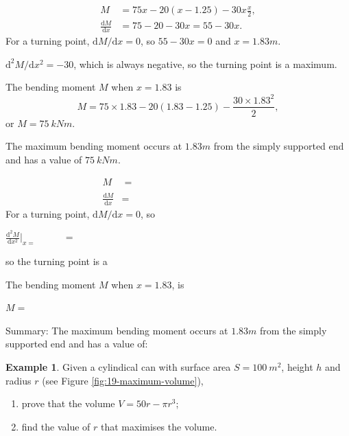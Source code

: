 \documentclass[
  english,
  11pt,
  oneside]{book}
\providecommand{\tightlist}{%
  \setlength{\itemsep}{0pt}\setlength{\parskip}{0pt}}
\newcommand{\slide}{}
\theoremstyle{definition}
\theoremstyle{definition}
\newtheorem{example}{Example}[chapter]
\theoremstyle{definition}
\theoremstyle{definition}
\theoremstyle{remark}
\begin{document}
\begin{notslides}

\begin{align*}
M &= 75x - 20(x-1.25) - 30x\frac{x}{2},\\
\frac{\mathrm{d}M}{\mathrm{d} x} &= 75-20-30x = 55 - 30x.
\end{align*}
For a turning point, \(\mathrm{d}M/\mathrm{d}x=0\), so \(55 - 30x = 0\) and \(x = 1.83 m\).

\(\mathrm{d}^2M/\mathrm{d}x^2 = -30\), which is always negative, so the turning point is a maximum.

The bending moment \(M\) when \(x = 1.83\) is
\[M = 75\times1.83 - 20(1.83 - 1.25) - \frac{30\times1.83^2}{2},\]
or \(M = 75\ kNm\).

The maximum bending moment occurs at \(1.83 m\) from the simply supported end and has a value of \(75\ kNm\).

\end{notslides}

\begin{slidesonly}

\begin{align*}
M &= \phantom{75x - 20(x-1.25) - 30x\frac{x}{2}}\\
\frac{\mathrm{d}M}{\mathrm{d} x} &= 
\end{align*}
For a turning point, \(\mathrm{d}M/\mathrm{d}x=0\), so

\vfill

\(\frac{\mathrm{d}^2M}{\mathrm{d}x^2}\Big|_{x=\phantom{asdfasdf}} =\)

so the turning point is a

\slide

The bending moment \(M\) when \(x = 1.83\), is

\(M=\)

\vfill

Summary: The maximum bending moment occurs at \(1.83m\) from the simply supported end and has a value of:
\slide

\end{slidesonly}

\begin{example}

Given a cylindical can with surface area \(S=100\ m^2\), height \(h\) and radius \(r\) (see Figure \ref{fig:19-maximum-volume}),

\begin{enumerate}
\def\labelenumi{\arabic{enumi}.}
\tightlist
\item
  prove that the volume \(V = 50r-\pi r^3\);
\item
  find the value of \(r\) that maximises the volume.
\end{enumerate}

\end{example}
\end{document}
